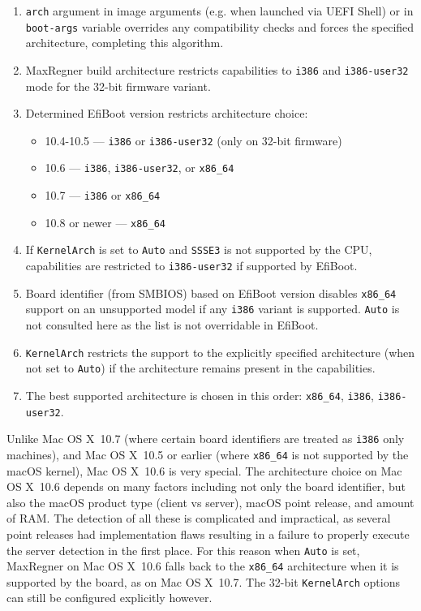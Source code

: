 \documentclass[]{article}
\providecommand{\tightlist}{%
  \setlength{\itemsep}{0pt}\setlength{\parskip}{0pt}}
\begin{document}
\begin{enumerate}
  \begin{enumerate}
    \tightlist
    \item \texttt{arch} argument in image arguments (e.g. when launched
    via UEFI Shell) or in \texttt{boot-args} variable overrides any compatibility
    checks and forces the specified architecture, completing this algorithm.
    \item MaxRegner build architecture restricts capabilities to \texttt{i386}
      and \texttt{i386-user32} mode for the 32-bit firmware variant.
    \item Determined EfiBoot version restricts architecture choice:
      \begin{itemize}
      \item 10.4-10.5 --- \texttt{i386} or \texttt{i386-user32} (only on 32-bit firmware)
      \item 10.6 --- \texttt{i386}, \texttt{i386-user32}, or \texttt{x86\_64}
      \item 10.7 --- \texttt{i386} or \texttt{x86\_64}
      \item 10.8 or newer --- \texttt{x86\_64}
      \end{itemize}
    \item If \texttt{KernelArch} is set to \texttt{Auto} and \texttt{SSSE3}
      is not supported by the CPU, capabilities are restricted to \texttt{i386-user32}
      if supported by EfiBoot.
    \item Board identifier (from SMBIOS) based on EfiBoot version
      disables \texttt{x86\_64} support on an unsupported model
      if any \texttt{i386} variant is supported. \texttt{Auto}
      is not consulted here as the list is not overridable in EfiBoot.
    \item \texttt{KernelArch} restricts the support to the explicitly
      specified architecture (when not set to \texttt{Auto}) if
      the architecture remains present in the capabilities.
    \item The best supported architecture is chosen in this order:
      \texttt{x86\_64}, \texttt{i386}, \texttt{i386-user32}.
  \end{enumerate}

  Unlike Mac OS X~10.7 (where certain board identifiers are treated as \texttt{i386}
  only machines), and Mac OS X~10.5 or earlier (where \texttt{x86\_64} is not supported
  by the macOS kernel), Mac OS X~10.6 is very special. The architecture choice on Mac OS X~10.6
  depends on many factors including not only the board identifier, but also the macOS
  product type (client vs server), macOS point release, and amount of RAM. The detection
  of all these is complicated and impractical, as several point releases had implementation
  flaws resulting in a failure to properly execute the server detection in the first place.
  For this reason when \texttt{Auto} is set, MaxRegner on Mac OS X~10.6 falls back
  to the \texttt{x86\_64} architecture when it is supported by the board, as
  on Mac OS X~10.7. The 32-bit \texttt{KernelArch} options can still be configured
  explicitly however.


\end{enumerate}
\end{document}
